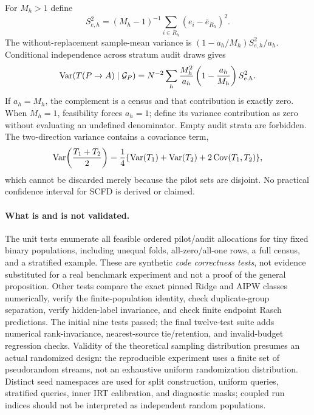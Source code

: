 For $M_h>1$ define
\begin{equation}\label{eq:residualvar}
S_{e,h}^2=(M_h-1)^{-1}\sum_{i\in R_h}(e_i-\bar e_{R_h})^2.
\end{equation}
The without-replacement sample-mean variance is $(1-a_h/M_h)S_{e,h}^2/a_h$. Conditional independence across stratum audit draws gives
\begin{equation}\label{eq:dirvar}
\operatorname{Var}(T(P\to A)\mid\mathcal G_P)
=N^{-2}\sum_h\frac{M_h^2}{a_h}\left(1-\frac{a_h}{M_h}\right)S_{e,h}^2.
\end{equation}
If $a_h=M_h$, the complement is a census and that contribution is exactly zero. When $M_h=1$, feasibility forces $a_h=1$; define its variance contribution as zero without evaluating an undefined denominator. Empty audit strata are forbidden. The two-direction variance contains a covariance term,
\begin{equation}
\operatorname{Var}\!\left(\frac{T_1+T_2}{2}\right)
=\frac14\{\operatorname{Var}(T_1)+\operatorname{Var}(T_2)+2\operatorname{Cov}(T_1,T_2)\},
\end{equation}
which cannot be discarded merely because the pilot sets are disjoint. No practical confidence interval for SCFD is derived or claimed.

\paragraph{What is and is not validated.}
The unit tests enumerate all feasible ordered pilot/audit allocations for tiny fixed binary populations, including unequal folds, all-zero/all-one rows, a full census, and a stratified example. These are synthetic \emph{code correctness tests}, not evidence substituted for a real benchmark experiment and not a proof of the general proposition. Other tests compare the exact pinned Ridge and AIPW classes numerically, verify the finite-population identity, check duplicate-group separation, verify hidden-label invariance, and check finite endpoint Rasch predictions. The initial nine tests passed; the final twelve-test suite adds numerical rank-invariance, nearest-source tie/retention, and invalid-budget regression checks. Validity of the theoretical sampling distribution presumes an actual randomized design: the reproducible experiment uses a finite set of pseudorandom streams, not an exhaustive uniform randomization distribution. Distinct seed namespaces are used for split construction, uniform queries, stratified queries, inner IRT calibration, and diagnostic masks; coupled run indices should not be interpreted as independent random populations.

